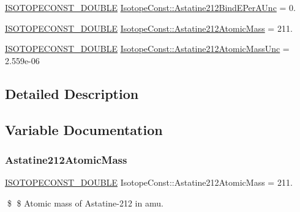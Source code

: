 \begin{DoxyCompactItemize}
\mbox{\hyperlink{group___isotope_const-_macros_ga8f45a7272ce02c0b4c65c44636ed719a}{I\+S\+O\+T\+O\+P\+E\+C\+O\+N\+S\+T\+\_\+\+D\+O\+U\+B\+LE}} \mbox{\hyperlink{group___isotope_const-_astatine-_at212_ga9cf2437ccda5691a078ad4fea30340e4}{Isotope\+Const\+::\+Astatine212\+Bind\+E\+Per\+A\+Unc}} = 0.
\item 
\mbox{\hyperlink{group___isotope_const-_macros_ga8f45a7272ce02c0b4c65c44636ed719a}{I\+S\+O\+T\+O\+P\+E\+C\+O\+N\+S\+T\+\_\+\+D\+O\+U\+B\+LE}} \mbox{\hyperlink{group___isotope_const-_astatine-_at212_gab3e06d5d4c4c95f4ca8cad1d13738a53}{Isotope\+Const\+::\+Astatine212\+Atomic\+Mass}} = 211.
\item 
\mbox{\hyperlink{group___isotope_const-_macros_ga8f45a7272ce02c0b4c65c44636ed719a}{I\+S\+O\+T\+O\+P\+E\+C\+O\+N\+S\+T\+\_\+\+D\+O\+U\+B\+LE}} \mbox{\hyperlink{group___isotope_const-_astatine-_at212_ga742045ef497425c15d384b9fd1bdb633}{Isotope\+Const\+::\+Astatine212\+Atomic\+Mass\+Unc}} = 2.\+559e-\/06
\end{DoxyCompactItemize}


\subsection{Detailed Description}


\subsection{Variable Documentation}
\mbox{\label{group___isotope_const-_astatine-_at212_gab3e06d5d4c4c95f4ca8cad1d13738a53}} 
\subsubsection{\texorpdfstring{Astatine212\+Atomic\+Mass}{Astatine212AtomicMass}}
{\footnotesize\ttfamily \mbox{\hyperlink{group___isotope_const-_macros_ga8f45a7272ce02c0b4c65c44636ed719a}{I\+S\+O\+T\+O\+P\+E\+C\+O\+N\+S\+T\+\_\+\+D\+O\+U\+B\+LE}} Isotope\+Const\+::\+Astatine212\+Atomic\+Mass = 211.}

\$ \$ Atomic mass of Astatine-\/212 in amu. \mbox{\label{group___isotope_const-_astatine-_at212_ga742045ef497425c15d384b9fd1bdb633}} 
